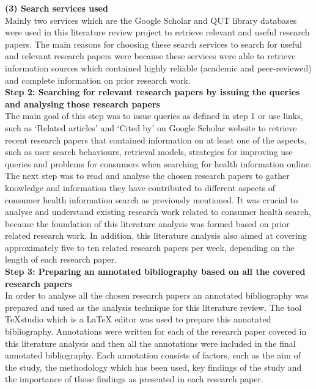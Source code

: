 \documentclass[]{article}
\begin{document}
\textbf{(3)	Search services used}\\
	
Mainly two services which are the Google Scholar and QUT library databases were used in this literature review project to retrieve relevant and useful research papers. The main reasons for choosing these search services to search for useful and relevant research papers were because these services were able to retrieve information sources which contained highly reliable (academic and peer-reviewed) and complete information on prior research work.\\   
	
\textbf{Step 2: Searching for relevant research papers by issuing the queries and analysing those research papers} \\ 
	
The main goal of this step was to issue queries as defined in step 1 or use links, such as ‘Related articles’ and ‘Cited by’ on Google Scholar website to retrieve recent research papers that contained information on at least one of the aspects, such as user search behaviours, retrieval models, strategies for improving use queries and problems for consumers when searching for health information online. The next step was to read and analyse the chosen research papers to gather knowledge and information they have contributed to different aspects of consumer health information search as previously mentioned. It was crucial to analyse and understand existing research work related to consumer health search, because the foundation of this literature analysis was formed based on prior related research work. In addition, this literature analysis also aimed at covering approximately five to ten related research papers per week, depending on the length of each research paper. \\            
	
\textbf{Step 3: Preparing an annotated bibliography based on all the covered research papers}\\ 
	
In order to analyse all the chosen research papers an annotated bibliography \cite{unc} was prepared and used as the analysis technique for this literature review. The tool TeXstudio which is a LaTeX editor was used to prepare this annotated bibliography. Annotations were written for each of the research paper covered in this literature analysis and then all the annotations were included in the final annotated bibliography. Each annotation consists of factors, such as the aim of the study, the methodology which has been used, key findings of the study and the importance of those findings as presented in each research paper. \\
	
\end{document}
